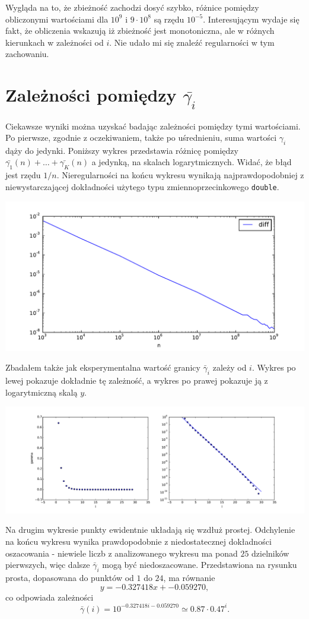 \documentclass{report}
\begin{document}
Wygląda na to, że zbieżność zachodzi dosyć szybko, różnice pomiędzy obliczonymi wartościami dla $10^9$ i $9\cdot 10^8$ są rzędu $10^{-5}$.
Interesującym wydaje się fakt, że obliczenia wskazują iż zbieżność jest monotoniczna, ale w różnych kierunkach w zależności od $i$. Nie udało mi się znaleźć regularności w tym zachowaniu.

\section*{Zależności pomiędzy $\bar{\gamma_i}$}

Ciekawsze wyniki można uzyskać badając zależności pomiędzy tymi wartościami. Po pierwsze, zgodnie z oczekiwaniem, także po uśrednieniu, suma wartości $\gamma_i$ dąży do jedynki.
Poniższy wykres przedstawia różnicę pomiędzy $\bar{\gamma_1}(n) + \ldots + \bar{\gamma_K}(n)$ a jedynką, na skalach logarytmicznych. Widać, że błąd jest rzędu $1/n$.
Nieregularności na końcu wykresu wynikają najprawdopodobniej z niewystarczającej dokładności użytego typu zmiennoprzecinkowego \texttt{double}.

\begin{center} \includegraphics[width=0.75 \linewidth]{2} \end{center}

Zbadałem także jak eksperymentalna wartość granicy $\bar{\gamma}_i$ zależy od $i$. Wykres po lewej pokazuje dokładnie tę zależność,
a wykres po prawej pokazuje ją z logarytmiczną skalą $y$.

\begin{center} \includegraphics[width=1 \linewidth]{3} \end{center}

Na drugim wykresie punkty ewidentnie układają się wzdłuż prostej. Odchylenie na końcu wykresu wynika prawdopodobnie z niedostatecznej dokładności oszacowania -
niewiele liczb z analizowanego wykresu ma ponad $25$ dzielników pierwszych, więc dalsze $\bar{\gamma}_i$ mogą być niedoszacowane. Przedstawiona na rysunku prosta,
dopasowana do punktów od $1$ do $24$, ma równanie
$$ y = -0.327418 x + -0.059270, $$
co odpowiada zależności
$$ \bar{\gamma}(i) = 10^{-0.327418 i - 0.059270} \simeq 0.87 \cdot 0.47^i. $$
\end{document}
